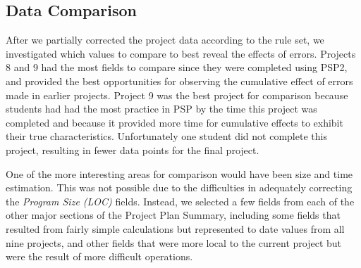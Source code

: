 \subsection{Data Comparison}

After we partially corrected the project data according 
to the rule set, we investigated which values to compare to best reveal the
effects of errors.  Projects 8 and 9 had the most fields to
compare since they were completed using PSP2, and provided the best
opportunities for observing the cumulative effect of errors made in earlier
projects. Project 9 was the best project for comparison because students
had had the most practice in PSP by the time this project was completed and
because it provided more time for cumulative effects to exhibit their true
characteristics. Unfortunately one student did not complete this project,
resulting in fewer data points for the final project.
   
One of the more interesting areas for comparison would have been size and
time estimation.  This was not possible due to the difficulties in
adequately correcting the {\it Program Size (LOC)} fields. Instead, we
selected a few fields from each of the other major sections of the Project
Plan Summary, including some fields that resulted from fairly simple
calculations but represented to date values from all nine projects, and
other fields that were more local to the current project but were the
result of more difficult operations.



